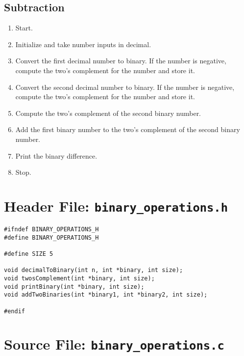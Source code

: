 \documentclass[a4paper,12pt]{article}
\begin{document}
\subsection*{Subtraction}
\begin{enumerate}
    \item Start.
    \item Initialize and take number inputs in decimal.
    \item Convert the first decimal number to binary. If the number is negative, compute the two's complement for the number and store it.
    \item Convert the second decimal number to binary. If the number is negative, compute the two's complement for the number and store it.
    \item Compute the two's complement of the second binary number.
    \item Add the first binary number to the two's complement of the second binary number.
    \item Print the binary difference.
    \item Stop.
\end{enumerate}

\section*{Header File: \texttt{binary\_operations.h}}

\begin{verbatim}
#ifndef BINARY_OPERATIONS_H
#define BINARY_OPERATIONS_H

#define SIZE 5

void decimalToBinary(int n, int *binary, int size);
void twosComplement(int *binary, int size);
void printBinary(int *binary, int size);
void addTwoBinaries(int *binary1, int *binary2, int size);

#endif
\end{verbatim}

\section*{Source File: \texttt{binary\_operations.c}}
\end{document}
